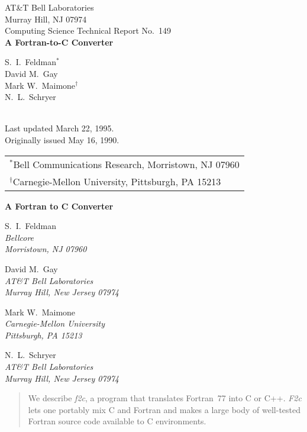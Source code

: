 \documentclass[12pt]{article}
\begin{document}
\begin{titlepage}
  \begin{center}
    \vspace*{10ex}
    AT\&T Bell Laboratories\\
    Murray Hill, NJ 07974
    \\[25ex]
    Computing Science Technical Report No.\ 149
    \\[2ex]
    \textbf{A Fortran-to-C Converter}
    \\[2ex]
    \begin{itshape}
    S.\ I.\ Feldman$^{*}$\\
    David M.\ Gay\\
    Mark W.\ Maimone$^{\text{†}}$\\
    N.\ L.\ Schryer
    \end{itshape}
      \\[35ex]
    Last updated March 22, 1995.\\
    Originally issued May 16, 1990.
    \\[8ex]
    \begin{tabular}{l}
      $^{*}$Bell Communications Research, Morristown, NJ 07960\\[1ex]
      $^{\text{†}}$Carnegie-Mellon University, Pittsburgh, PA 15213
    \end{tabular}
  \end{center}
\end{titlepage}

\thispagestyle{empty}

\begin{center}
\textbf{A Fortran to C Converter}

S.\ I.\ Feldman\\
\emph{Bellcore}\\
\emph{Morristown, NJ 07960}

David M.\ Gay\\
\emph{AT\&T Bell Laboratories}\\
\emph{Murray Hill, New Jersey 07974}

Mark W.\ Maimone\\
\emph{Carnegie-Mellon University}\\
\emph{Pittsburgh, PA 15213}

N.\ L.\ Schryer\\
\emph{AT\&T Bell Laboratories}\\
\emph{Murray Hill, New Jersey 07974}
\end{center}
\begin{abstract}
\noindent
We describe \emph{f2c}, a program that translates Fortran~77 into C or C++. \emph{F2c} lets one portably mix C and Fortran and makes a large body of well-tested Fortran source code available to C environments.
\end{abstract}
\end{document}
